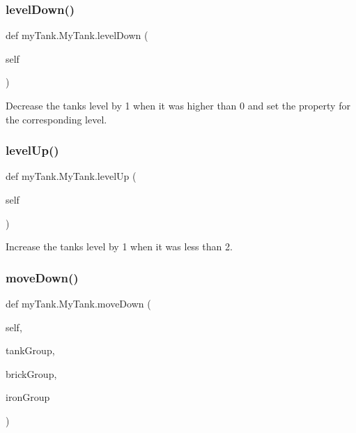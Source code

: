 \subsubsection{\texorpdfstring{levelDown()}{levelDown()}}
{\footnotesize\ttfamily def my\+Tank.\+My\+Tank.\+level\+Down (\begin{DoxyParamCaption}\item[{}]{self }\end{DoxyParamCaption})}



Decrease the tank\textquotesingle{}s level by 1 when it was higher than 0 and set the property for the corresponding level. 

\mbox{\label{classmy_tank_1_1_my_tank_ad3e73075a206bf2ca14412bea6db8d36}} 
\subsubsection{\texorpdfstring{levelUp()}{levelUp()}}
{\footnotesize\ttfamily def my\+Tank.\+My\+Tank.\+level\+Up (\begin{DoxyParamCaption}\item[{}]{self }\end{DoxyParamCaption})}



Increase the tank\textquotesingle{}s level by 1 when it was less than 2. 

\mbox{\label{classmy_tank_1_1_my_tank_a1f7299a4f87790fbfb0d3323196547ae}} 
\subsubsection{\texorpdfstring{moveDown()}{moveDown()}}
{\footnotesize\ttfamily def my\+Tank.\+My\+Tank.\+move\+Down (\begin{DoxyParamCaption}\item[{}]{self,  }\item[{}]{tank\+Group,  }\item[{}]{brick\+Group,  }\item[{}]{iron\+Group }\end{DoxyParamCaption})}



